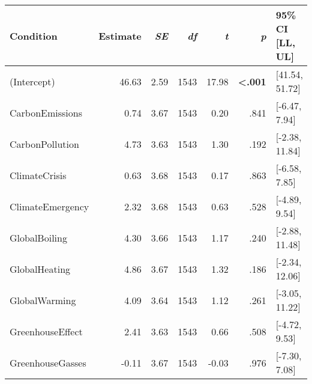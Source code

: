 \begin{table}[ht]
\centering
\begin{tabular}{lrrrrrl}
  \hline
Condition & Estimate & \textit{SE} & \textit{df} & \textit{t} & \textit{p} & 95\% CI [LL, UL] \\ 
  \hline
(Intercept) & 46.63 & 2.59 & 1543 & 17.98 & \textbf{\textless  .001} & [41.54, 51.72] \\ 
  CarbonEmissions & 0.74 & 3.67 & 1543 & 0.20 & .841 & [-6.47, 7.94] \\ 
  CarbonPollution & 4.73 & 3.63 & 1543 & 1.30 & .192 & [-2.38, 11.84] \\ 
  ClimateCrisis & 0.63 & 3.68 & 1543 & 0.17 & .863 & [-6.58, 7.85] \\ 
  ClimateEmergency & 2.32 & 3.68 & 1543 & 0.63 & .528 & [-4.89, 9.54] \\ 
  GlobalBoiling & 4.30 & 3.66 & 1543 & 1.17 & .240 & [-2.88, 11.48] \\ 
  GlobalHeating & 4.86 & 3.67 & 1543 & 1.32 & .186 & [-2.34, 12.06] \\ 
  GlobalWarming & 4.09 & 3.64 & 1543 & 1.12 & .261 & [-3.05, 11.22] \\ 
  GreenhouseEffect & 2.41 & 3.63 & 1543 & 0.66 & .508 & [-4.72, 9.53] \\ 
  GreenhouseGasses & -0.11 & 3.67 & 1543 & -0.03 & .976 & [-7.30, 7.08] \\ 
   \hline
\end{tabular}
\end{table}

